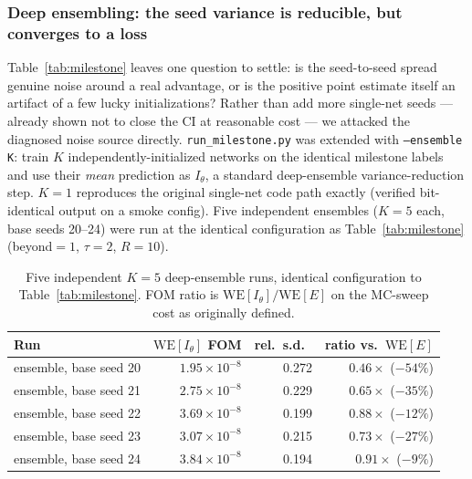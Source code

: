 \documentclass[a4paper,fleqn]{cas-sc}
\begin{document}
	\subsubsection{Deep ensembling: the seed variance is reducible, but converges to a loss}
	\label{sec:ensemble}
	Table~\ref{tab:milestone} leaves one question to settle: is the seed-to-seed spread genuine
	noise around a real advantage, or is the positive point estimate itself an artifact of a few
	lucky initializations? Rather than add more single-net seeds --- already shown not to close
	the CI at reasonable cost --- we attacked the diagnosed noise source directly.
	\texttt{run\_milestone.py} was extended with \texttt{--ensemble K}: train $K$
	independently-initialized networks on the identical milestone labels and use their
	\emph{mean} prediction as $I_\theta$, a standard deep-ensemble variance-reduction step.
	$K=1$ reproduces the original single-net code path exactly (verified bit-identical output on
	a smoke config). Five independent ensembles ($K=5$ each, base seeds 20--24) were run at the
	identical configuration as Table~\ref{tab:milestone} (beyond$=1$, $\tau=2$, $R=10$).
	
	\begin{table}[H]
		\centering\small
		\caption{Five independent $K{=}5$ deep-ensemble runs, identical configuration to
			Table~\ref{tab:milestone}. FOM ratio is $\mathrm{WE}[I_\theta]/\mathrm{WE}[E]$ on the
			MC-sweep cost as originally defined.}
		\label{tab:ensemble}
		\begin{tabular}{lrrr}
			\toprule
			Run & $\mathrm{WE}[I_\theta]$ FOM & rel.\ s.d.\ & ratio vs.\ $\mathrm{WE}[E]$ \\
			\midrule
			ensemble, base seed 20 & $1.95\times10^{-8}$ & 0.272 & $0.46\times$ ($-54\%$) \\
			ensemble, base seed 21 & $2.75\times10^{-8}$ & 0.229 & $0.65\times$ ($-35\%$) \\
			ensemble, base seed 22 & $3.69\times10^{-8}$ & 0.199 & $0.88\times$ ($-12\%$) \\
			ensemble, base seed 23 & $3.07\times10^{-8}$ & 0.215 & $0.73\times$ ($-27\%$) \\
			ensemble, base seed 24 & $3.84\times10^{-8}$ & 0.194 & $0.91\times$ ($-9\%$) \\
			\bottomrule
		\end{tabular}
	\end{table}
	
\end{document}
